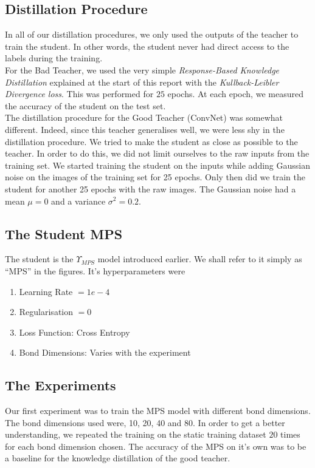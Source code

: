 \documentclass{article}
\theoremstyle{definition}
\theoremstyle{definition}
\begin{document}
\subsection{Distillation Procedure}
In all of our distillation procedures, we only used the outputs of the teacher to train the student. In other words, the student never had direct access to the labels during the training. \\

For the Bad Teacher, we used the very simple \emph{Response-Based Knowledge Distillation} explained at the start of this report with the \emph{Kullback-Leibler Divergence loss}. This was performed for $25$ epochs. At each epoch, we measured the accuracy of the student on the test set. \\

The distillation procedure for the Good Teacher (ConvNet) was somewhat different. Indeed, since this teacher generalises well, we were less shy in the distillation procedure. We tried to make the student as close as possible to the teacher. In order to do this, we did not limit ourselves to the raw inputs from the training set. We started training the student on the inputs while adding Gaussian noise on the images of the training set for 25 epochs. Only then did we train the student for another 25 epochs with the raw images. The Gaussian noise had a mean $\mu=0$ and a variance $\sigma^2=0.2$.


\subsection{The Student MPS}
The student is the $\Upsilon_{MPS}$ model introduced earlier. We shall refer to it simply as \enquote{MPS} in the figures.
It's hyperparameters were
\begin{enumerate}
    \item Learning Rate $= 1e-4$
    \item Regularisation $= 0$
    \item Loss Function: Cross Entropy
    \item Bond Dimensions: Varies with the experiment
\end{enumerate}

\subsection{The Experiments}
Our first experiment was to train the MPS model with different bond dimensions. The bond dimensions used were, 10, 20, 40 and 80. In order to get a better understanding, we repeated the training on the static training dataset $20$ times for each bond dimension chosen. The accuracy of the MPS on it's own was to be a baseline for the knowledge distillation of the good teacher.
\end{document}
